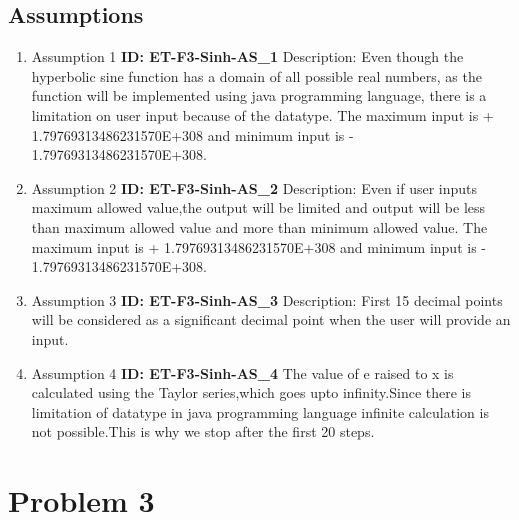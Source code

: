 \documentclass{article}
\begin{document}
\subsection{Assumptions}
\begin{enumerate}
    \item Assumption 1\newline
    \textbf{ID: ET-F3-Sinh-AS\_1} \newline
    Description: Even though the hyperbolic sine function has a domain of all possible real numbers, as the function will be implemented using java programming language, there is a limitation on user input because of the datatype.\newline
    The maximum input is + 1.79769313486231570E+308  and minimum input is - 1.79769313486231570E+308.
    \item Assumption 2\newline
    \textbf{ID: ET-F3-Sinh-AS\_2} \newline
    Description: Even if user inputs maximum allowed value,the output will be limited and output will be less than maximum allowed value and more than minimum allowed value.\newline
    The maximum input is + 1.79769313486231570E+308  and minimum input is - 1.79769313486231570E+308.
    \item Assumption 3\newline
    \textbf{ID: ET-F3-Sinh-AS\_3} \newline 
    Description: First 15 decimal points will be considered as a significant decimal point when the user will provide an input.
    \item Assumption 4\newline
    \textbf{ID: ET-F3-Sinh-AS\_4} \newline The value of e raised to x is calculated using the Taylor series,which goes upto infinity.Since there is limitation of datatype in java programming language infinite calculation is not possible.This is why we stop after the first 20 steps.
\end{enumerate}
\newpage
\section{Problem 3}
\end{document}
